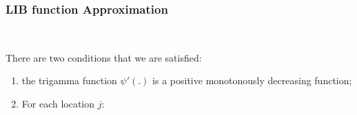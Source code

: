 \documentclass[11pt,reqno]{amsart}
\begin{document}
\subsubsection{LIB function Approximation} \

There are two conditions that we are satisfied:
\begin{enumerate}[noitemsep]
	\item the trigamma function $ \psi ' (.)  $ is a positive monotonously decreasing function;
	\item For each location $j$:
\end{enumerate}


%
%
\end{document}
